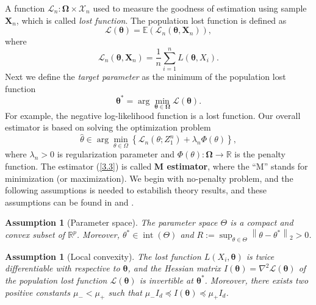 \documentclass[12pt]{article}
\numberwithin{equation}{section}
\newtheorem{assumption}[theorem]{Assumption}
\begin{document}
A function $\mathcal{L}_n:\boldsymbol{\Omega}\times \mathcal{X}_n$ used to measure the goodness of estimation using sample $\boldsymbol{X}_n$, which is called \textit{lost function}. The population lost function is defined as
\begin{equation}
\mathcal{L}(\boldsymbol{\theta})=\mathbb{E}\left(\mathcal{L}_n\left(\boldsymbol{\theta},\boldsymbol{X}_n\right)\right),
\end{equation}
where
$$
\mathcal{L}_n\left(\boldsymbol{\theta},\boldsymbol{X}_n\right)=\frac{1}{n}\sum_{i=1}^nL(\boldsymbol{\theta},X_i).
$$
Next we define the \textit{target parameter} as the minimum of the population lost function
\begin{equation}
\boldsymbol{\theta}^{*}=\arg\min_{\boldsymbol{\theta}\in \boldsymbol{\Omega}}\mathcal{L}(\boldsymbol{\theta}).
\end{equation}
For example, the negative log-likelihood function is a lost function. Our overall estimator is based on solving the optimization problem
\begin{equation}\label{3.3}
\widehat{\theta} \in \arg \min _{\theta \in \Omega}\left\{\mathcal{L}_{n}\left(\theta ; Z_{1}^{n}\right)+\lambda_{n} \Phi(\theta)\right\},
\end{equation}
where $\lambda_{n}>0$ is regularization parameter and $\Phi(\theta): \boldsymbol{\Omega}\to \mathbb{R}$ is the penalty function. The estimator (\ref{3.3}) is called \textbf{M estimator}, where the “M” stands for minimization (or maximization).
We begin with no-penalty problem, and the following assumptions is needed to estabilish theory results, and these assumptions can be found in \citet{zhang2013communication} and \citet{jordan2019communication}.
\begin{assumption}[Parameter space]
	The parameter space $\Theta$ is	a compact and convex subset of $\mathbb{R}^p$. Moreover, $\theta^{*} \in \operatorname{int}(\Theta)$ and $R:=\sup _{\theta \in \Theta}\left\|\theta-\theta^{*}\right\|_{2}>0$.
\end{assumption}
\begin{assumption}[Local convexity]\label{assumption3.1}
The lost function $L(X_i,\boldsymbol{\theta})$ is twice differentiable with respective to $\boldsymbol{\theta}$, and the Hessian matrix $I(\boldsymbol{\theta})=\nabla^2\mathcal{L}(\boldsymbol{\theta})$ of the population lost function $\mathcal{L}(\boldsymbol{\theta})$ is invertible at $\boldsymbol{\theta}^{*}$. Moreover, there exists two positive constants $\mu_{-}<\mu_{+}$ such that $\mu_{-} I_{d} \preceq I(\boldsymbol{\theta}) \preceq \mu_{+} I_{d}$.
\end{assumption}
\end{document}
